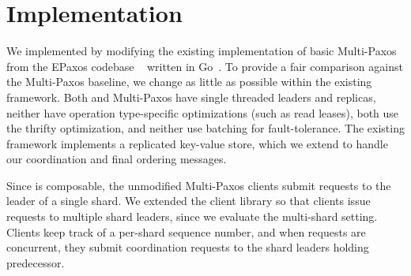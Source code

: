 \section{Implementation}
\label{sec:implementation}

We implemented \sys{} by modifying the existing implementation of basic Multi-Paxos from the EPaxos codebase ~\cite{} written in Go~\cite{}. To provide a fair comparison against the Multi-Paxos baseline, we change as little as possible within the existing framework. Both \sys{} and Multi-Paxos have single threaded leaders and replicas, neither have operation type-specific optimizations (such as read leases), both use the thrifty optimization, and neither use batching for fault-tolerance. The existing framework implements a replicated key-value store,
which we extend to handle our coordination and final ordering messages.

Since \sdl{} is composable, the unmodified Multi-Paxos clients submit requests to the leader of a single shard. We extended the client library so that clients issue requests to multiple shard leaders, since we evaluate the multi-shard setting. Clients keep track of a per-shard sequence number, and when requests are concurrent, they submit coordination requests to the shard leaders holding predecessor.

